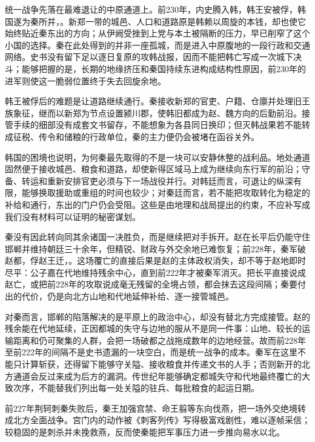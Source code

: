 
统一战争先落在最难退让的中原通道上。前230年，内史腾入韩，韩王安被俘，韩国遂为秦所并，。新郑一带的城邑、人口和道路原是韩赖以周旋的本钱，却也使它始终贴近秦东出的方向；从伊阙受挫到上党与本土被隔断的压力，早已削窄了这个小国的选择。秦在此处得到的并非一座孤城，而是进入中原腹地的一段行政和交通网络。史书没有留下足以逐日复原的攻韩战报，因而不能把韩亡写成一次城下决斗；能够把握的是，长期的地缘挤压和秦国持续东进构成结构性原因，前230年的进军则使这一脆弱位置终于失去回旋余地。

韩王被俘后的难题是让道路继续通行。秦接收新郑的官吏、户籍、仓廪并处理旧王族象征，继而以新郑为节点设置颍川郡，使韩旧都成为赵、魏方向的后勤前沿。接管手续的细部没有成套文书留存，不能想象为各县同日换印；但灭韩战果若不能转成征税、传令和储粮的行政单位，秦的主力便仍会被堵在函谷关外。

韩国的困境也说明，为何秦最先取得的不是一块可以安静休整的战利品。地处通道固然便于接收城邑、粮食和道路，却使新得区域马上成为继续向东行军的前沿；守备、转运和重新安排官吏必须与下一场战役并行。对韩廷而言，可退让的纵深有限，能够换取援助或重组的时间也较少；对秦廷而言，若不能把攻取转化为稳定的补给和通行，东出的门户仍会受阻。这些是由地理和战局提出的约束，不应补写成我们没有材料可以证明的秘密谋划。

秦没有因此转向同其余诸国一决胜负，而是继续把对手拆开。赵在长平后仍能守住邯郸并维持朝廷三十余年，但精锐、财政与外交余地已难恢复；前228年，秦军破赵都，俘赵王迁，。这场覆亡的直接后果是赵的主体政权消失，却不等于赵地即时尽平：公子嘉在代地维持残余中心，直到前222年才被秦军消灭。把长平直接说成赵亡，或把前228年的攻取说成毫无残留的全境占领，都会抹去这段间隔；秦要付出的代价，仍是向北方山地和代地延伸补给、逐一接管城邑。

对秦而言，邯郸的陷落解决的是平原上的政治中心，却没有替北方完成接管。赵的残余能在代地延续，正因都城的失守与边地的服从不是同一件事：山地、较长的运输距离和仍可聚集的人群，会把一场破都之战拖成数年的边地经营。故而前228年至前222年的间隔不是史书遗漏的一块空白，而是统一战争的成本。秦军在这里不能只计算斩获，还得留下能够守关隘、接收粮食并传递文书的人手；否则新开的北方通道会反过来成为后方的漏洞。传世纪年能够确定都城失守和代地最终覆亡的大致次序，不能替我们列出每一处关隘的驻兵、每批粮食的起运日期。

前227年荆轲刺秦失败后，秦王加强宫禁、命王翦等东向伐燕，把一场外交绝境转成北方全面战争。宫门内的动作被《刺客列传》写得极富戏剧性，难以逐帧采信；较稳固的是刺杀并未挽救燕，反而使秦能把军事压力进一步推向易水以北。

